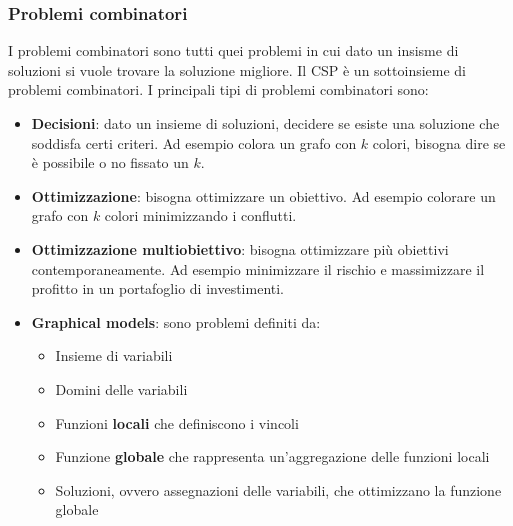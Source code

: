 \documentclass[a4paper]{article}
\begin{document}
\subsubsection{Problemi combinatori}
I problemi combinatori sono tutti quei problemi in cui dato un insisme di soluzioni
si vuole trovare la soluzione migliore. Il CSP è un sottoinsieme di problemi combinatori.
I principali tipi di problemi combinatori sono:
\begin{itemize}
  \item \textbf{Decisioni}: dato un insieme di soluzioni, decidere se esiste una soluzione
    che soddisfa certi criteri. Ad esempio colora un grafo con \( k \) colori, bisogna
    dire se è possibile o no fissato un \( k \).
  \item \textbf{Ottimizzazione}: bisogna ottimizzare un obiettivo. Ad esempio colorare
    un grafo con \( k \) colori minimizzando i conflutti.
  \item \textbf{Ottimizzazione multiobiettivo}: bisogna ottimizzare più obiettivi
    contemporaneamente. Ad esempio minimizzare il rischio e massimizzare il profitto in
    un portafoglio di investimenti.
  \item \textbf{Graphical models}: sono problemi definiti da:
    \begin{itemize}
      \item Insieme di variabili
      \item Domini delle variabili
      \item Funzioni \textbf{locali} che definiscono i vincoli
      \item Funzione \textbf{globale} che rappresenta un'aggregazione delle funzioni locali
      \item Soluzioni, ovvero assegnazioni delle variabili, che ottimizzano la funzione
        globale
    \end{itemize}
\end{itemize}
\end{document}
